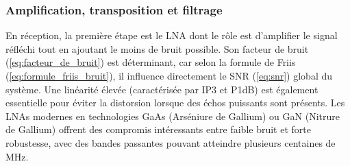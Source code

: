 \subsubsection{Amplification, transposition et filtrage}

En réception, la première étape est le LNA dont le rôle est d’amplifier le signal réfléchi tout en ajoutant le moins de bruit possible. Son facteur de bruit (\ref{eq:facteur_de_bruit}) est déterminant, car selon la formule de Friis (\ref{eq:formule_friis_bruit}), il influence directement le SNR (\ref{eq:snr}) global du système. Une linéarité élevée (caractérisée par IP3 et P1dB) est également essentielle pour éviter la distorsion lorsque des échos puissants sont présents. Les LNAs modernes en technologies GaAs (Arséniure de Gallium) ou GaN (Nitrure de Gallium) offrent des compromis intéressants entre faible bruit et forte robustesse, avec des bandes passantes pouvant atteindre plusieurs centaines de MHz.


